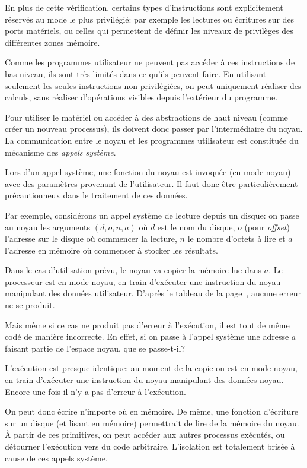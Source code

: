 En plus de cette vérification, certains types d'instructions sont explicitement
réservés au mode le plus privilégié: par exemple les lectures ou écritures sur
des ports matériels, ou celles qui permettent de définir les niveaux de
privilèges des différentes zones mémoire.

Comme les programmes utilisateur ne peuvent pas accéder à ces instructions de
bas niveau, ils sont très limités dans ce qu'ils peuvent faire. En utilisant
seulement les seules instructions non privilégiées, on peut uniquement réaliser
des calculs, sans réaliser d'opérations visibles depuis l'extérieur du
programme.

Pour utiliser le matériel ou accéder à des abstractions de haut niveau (comme
créer un nouveau processus), ils doivent donc passer par l'intermédiaire du
noyau. La communication entre le noyau et les programmes utilisateur est
constituée du mécanisme des \emph{appels système}.

Lors d'un appel système, une fonction du noyau est invoquée (en mode noyau) avec
des paramètres provenant de l'utilisateur. Il faut donc être particulièrement
précautionneux dans le traitement de ces données.

Par exemple, considérons un appel système de lecture depuis un disque: on passe
au noyau les arguments $(d, o, n, a)$ où $d$ est le nom du disque, $o$ (pour
\emph{offset}) l'adresse sur le disque où commencer la lecture, $n$ le nombre
d'octets à lire et $a$ l'adresse en mémoire où commencer à stocker les
résultats.

Dans le cas d'utilisation prévu, le noyau va copier la mémoire lue dans $a$. Le
processeur est en mode noyau, en train d'exécuter une instruction du noyau
manipulant des données utilisateur. D'après le tableau de la
page~\pageref{page:erreursec}, aucune erreur ne se produit.

Mais même si ce cas ne produit pas d'erreur à l'exécution, il est tout de même
codé de manière incorrecte. En effet, si on passe à l'appel système une adresse
$a$ faisant partie de l'espace noyau, que se passe-t-il?

L'exécution est presque identique: au moment de la copie on est en mode noyau,
en train d'exécuter une instruction du noyau manipulant des données noyau.
Encore une fois il n'y a pas d'erreur à l'exécution.

On peut donc écrire n'importe où en mémoire. De même, une fonction d'écriture
sur un disque (et lisant en mémoire) permettrait de lire de la mémoire du noyau.
À partir de ces primitives, on peut accéder aux autres processus exécutés, ou
détourner l'exécution vers du code arbitraire. L'isolation est totalement
brisée à cause de ces appels système.

